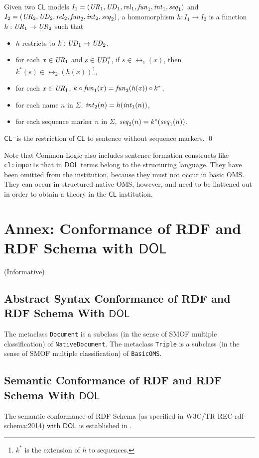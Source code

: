 \documentclass[10pt,fleqn,final]{scrreprt}
\newcommand*{\syntax}[1]{\texttt{#1}}
\newcommand*{\CL}{\ensuremath{\mathsf{CL}}\xspace}
\newcommand*{\DOL}{\ensuremath{\mathsf{DOL}}\xspace}
\newcommand{\CLminus}{\CL$^-$}
\newcommand{\informative}[0]{{\begin{center}{\Large{(Informative})}\end{center}} \bigskip}
\newcommand{\nisref}[1]{#1}
\newcommand{\infannex}[1]{ \chapter{Annex: #1}  \informative }
\newenvironment{definitions}[0]{\medskip }{}
\begin{document}
\begin{definitions}
\begin{definition}
Given two \CL models $I_1=(\mathit{UR}_1,\mathit{UD}_1,\mathit{rel}_1,\mathit{fun}_1,\mathit{int}_1,\mathit{seq}_1)$
and  $I_2=(\mathit{UR}_2,\mathit{UD}_2,\mathit{rel}_2,\mathit{fun}_2,\mathit{int}_2,\mathit{seq}_2)$, a homomorphism
$h:I_1\to I_2$ is a function $h:\mathit{UR}_1\to\mathit{UR}_2$ such that
\begin{itemize}
\item $h$ restricts to $k:\mathit{UD}_1\to\mathit{UD}_2$,
\item for each $x\in\mathit{UR}_1$ and $s\in\mathit{UD}_1^*$, if $s\in\rel_1(x)$, then $k^*(s)\in\rel_2(h(x))$\footnote{$k^*$ is the extension of $h$ to sequences.},
\item for each $x\in\mathit{UR}_1$, $k\circ\mathit{fun}_1(x)=\mathit{fun}_2(h(x))\circ k^*$,
\item for each name $n$ in $\Sigma$, $\mathit{int}_2(n)=h(\mathit{int}_1(n))$,
\item for each sequence marker $n$ in $\Sigma$, $\mathit{seq}_2(n)=k^*(\mathit{seq}_1(n))$.
\end{itemize}

  \CLminus is the restriction of \CL to sentence
without sequence markers.
\qed\end{definition}

Note that Common Logic also includes sentence formation constructs like
\texttt{cl:import}s that in \DOL terms belong to the structuring
language. They have been omitted from the institution, because
they must not occur in basic OMS. They can occur in
structured native OMS, however, and need to be flattened out
in order to obtain a theory in the \CL institution.
 
\infannex{Conformance of RDF and RDF Schema with \DOL}\label{a:rdfs}

\section{Abstract Syntax Conformance of RDF and RDF Schema  With \DOL}

The metaclass \syntax{Document} is a subclass (in the sense of SMOF
multiple classification) of \syntax{NativeDocument}.
The metaclass \syntax{Triple} is a subclass (in the sense of SMOF
multiple classification) of \syntax{BasicOMS}.

\section{Semantic Conformance of RDF and RDF Schema  With \DOL}

The semantic conformance of RDF Schema (as specified in \nisref{W3C/TR REC-rdf-schema:2014}) with \DOL is established in \cite{OntoGraph}.


\end{definitions}
\end{document}
